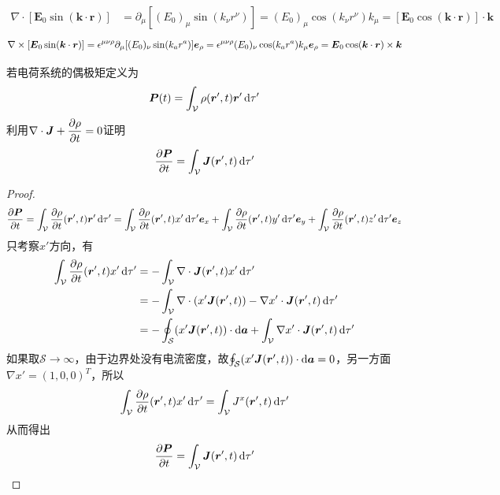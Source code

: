 \documentclass{mynote}
\begin{document}
\begin{solution}
    \begin{align*}
        \nabla \cdot [\bm{E}_0 \sin (\bm{k} \cdot \bm{r})] &= \partial_{\mu} \left[ (E_0)_{\mu} \sin (k_{\nu} r^{\nu}) \right] = (E_0)_{\mu} \cos (k_{\nu} r^{\nu}) k_{\mu} = [\bm{E}_0 \cos (\bm{k}\cdot \bm{r})] \cdot \bm{k}
    \end{align*}
    \begin{align*}
        \nabla \times [\boldsymbol{E}_0 \sin (\boldsymbol{k} \cdot \boldsymbol{r})] =  \epsilon^{\mu \nu \rho} \partial_{\mu} [(E_0)_{\nu} \sin (k_{a} r^a)] \boldsymbol{e}_{\rho} 
        = \epsilon^{\mu \nu \rho} (E_{0})_{\nu} \cos (k_a r^a) k_{\mu} \boldsymbol{e}_{\rho}
        = \boldsymbol{E}_0 \cos(\boldsymbol{k} \cdot \boldsymbol{r}) \times \boldsymbol{k}
    \end{align*}
\end{solution}






\begin{exercise}{1.5}
    若电荷系统的偶极矩定义为
    \[
    \boldsymbol{P}(t) = \int_{\mathcal{V}} \rho(\boldsymbol{r}', t) \boldsymbol{r}' \mathop{}\!\mathrm{d} \tau'    
    \]
    利用$\nabla \cdot \boldsymbol{J} + \dfrac{\partial \rho}{\partial t} = 0$证明
    \[\dfrac{\partial \boldsymbol{P}}{\partial t} = \int_{\mathcal{V}} \boldsymbol{J}(\boldsymbol{r}',t)\mathop{}\!\mathrm{d} \tau'\]
\end{exercise}
\begin{proof}
    \[
    \dfrac{\partial \boldsymbol{P}}{\partial t} = \int_{\mathcal{V}} \dfrac{\partial \rho}{\partial t}(\boldsymbol{r}', t) \boldsymbol{r}' \mathop{}\!\mathrm{d} \tau' = \int_{\mathcal{V}} \dfrac{\partial \rho}{\partial t}(\boldsymbol{r}', t) x' \mathop{}\!\mathrm{d} \tau' \boldsymbol{e}_x +  \int_{\mathcal{V}} \dfrac{\partial \rho}{\partial t}(\boldsymbol{r}', t) y' \mathop{}\!\mathrm{d} \tau' \boldsymbol{e}_y +  \int_{\mathcal{V}} \dfrac{\partial \rho}{\partial t}(\boldsymbol{r}', t) z' \mathop{}\!\mathrm{d} \tau' \boldsymbol{e}_z  
    \]
    只考察$x'$方向，有
    \begin{align*}
        \int_{\mathcal{V}} \dfrac{\partial \rho}{\partial t}(\boldsymbol{r}', t) x' \mathop{}\!\mathrm{d} \tau' &= -\int_{\mathcal{V}} \nabla \cdot \boldsymbol{J} (\boldsymbol{r}', t) x' \mathop{}\!\mathrm{d} \tau' \\
        &= -\int_{\mathcal{V}} \nabla \cdot (x'\boldsymbol{J} (\boldsymbol{r}', t)) - \nabla x' \cdot \boldsymbol{J} (\boldsymbol{r}', t) \mathop{}\!\mathrm{d} \tau' \\
        &= -\oint_{\mathcal{S}} (x'\boldsymbol{J} (\boldsymbol{r}', t)) \cdot \mathop{}\!\mathrm{d} \boldsymbol{a} + \int_{\mathcal{V}}\nabla x' \cdot \boldsymbol{J} (\boldsymbol{r}', t) \mathop{}\!\mathrm{d} \tau'
    \end{align*}
    如果取$\mathcal{S} \to \infty$，由于边界处没有电流密度，故$\oint_{\mathcal{S}} (x'\boldsymbol{J} (\boldsymbol{r}', t)) \cdot \mathop{}\!\mathrm{d} \boldsymbol{a} = 0$，另一方面$\nabla x' = (1, 0, 0)^{T}$，所以
    \[
        \int_{\mathcal{V}} \dfrac{\partial \rho}{\partial t}(\boldsymbol{r}', t) x' \mathop{}\!\mathrm{d} \tau' = \int_{\mathcal{V}}J^{x} (\boldsymbol{r}', t) \mathop{}\!\mathrm{d} \tau'
    \]
    从而得出
    \[
        \dfrac{\partial \boldsymbol{P}}{\partial t} = \int_{\mathcal{V}}\boldsymbol{J} (\boldsymbol{r}', t) \mathop{}\!\mathrm{d} \tau'
    \]
\end{proof}
\end{document}
